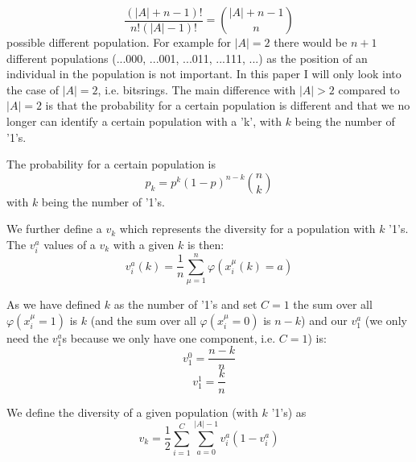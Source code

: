 \documentclass[a4paper,twoside]{report}
\begin{document}
\begin{equation}
\frac{(|A|+n-1)!}{n!(|A|-1)!} = {|A|+n-1 \choose n}
\end{equation}
possible different population. For example for \(|A|=2\) there would be \(n+1\) different populations (...000, ...001, ...011, ...111, ...) as the position of an individual in the population is not important. In this paper I will only look into the case of \(|A| = 2\), i.e. bitsrings. The main difference with \(|A|>2\) compared to \(|A|=2\) is that the probability for a certain population is different and that we no longer can identify a certain population with a 'k', with \(k\) being the number of '1's.








The probability for a certain population is 
\begin{equation}
p_k = p^k (1 - p)^{n - k} {n \choose k}
\end{equation}
with \(k\) being the number of '1's.

We further define a \(v_k\) which represents the diversity for a population with \(k\) '1's.
The \(v^{a}_i\) values of a \(v_k\) with a given \(k\) is then:
\begin{equation}
v^{a}_i(k) = \frac{1}{n} \sum_{\mu=1}^{n} \varphi(x^{\mu}_i(k) = a)
\end{equation}

As we have defined \(k\) as the number of '1's and set \(C = 1\) the sum over all \(\varphi(x^{\mu}_i = 1)\) is \(k\) (and the sum over all \(\varphi(x^{\mu}_i = 0)\) is \(n-k\)) and our \(v^{a}_1\) (we only need the \(v^{a}_1\)s because we only have one component, i.e. \(C = 1\)) is:
\[
v^{0}_1 = \frac{n-k}{n}
\]
\[
v^{1}_1 = \frac{k}{n}
\]

We define the diversity of a given population (with \(k\) '1's) as
\begin{equation}
v_k = \frac{1}{2} \sum_{i=1}^{C} \sum_{a=0}^{|A| - 1} v^{a}_i (1 - v^{a}_i)
\end{equation}
\end{document}
